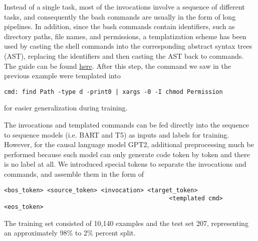 \documentclass{article}
\begin{document}
Instead of a single task, most of the invocations involve a sequence of
different tasks, and consequently the bash commands are usually in the form of
long pipelines. In addition, since the bash commands contain identifiers, such
as directory paths, file names, and permissions, a templatization scheme has
been used by casting the shell commands into the corresponding abstract syntax
trees (AST), replacing the identifiers and then casting the AST back to
commands. The guide can be found
\href{https://github.com/IBM/clai/tree/nlc2cmd}{here}. After this step, the
command we saw in the previous example were templated into
\begin{verbatim}
cmd: find Path -type d -print0 | xargs -0 -I chmod Permission
\end{verbatim}
for easier generalization during training.

The invocations and templated commands can be fed directly into the sequence
to sequence models (i.e. BART and T5) as inputs and labels for training.
However, for the causal language model GPT2, additional preprocessing much be
performed because such model can only generate code token by token and there is
no label at all. We introduced special tokens to separate the invocations and
commands, and assemble them in the form of

\begin{verbatim}
<bos_token> <source_token> <invocation> <target_token>
                                              <templated cmd> <eos_token> 
\end{verbatim}

The training set consisted of 10,140 examples and the test set 207, representing an approximately 98\% to 2\% percent split.
\end{document}
